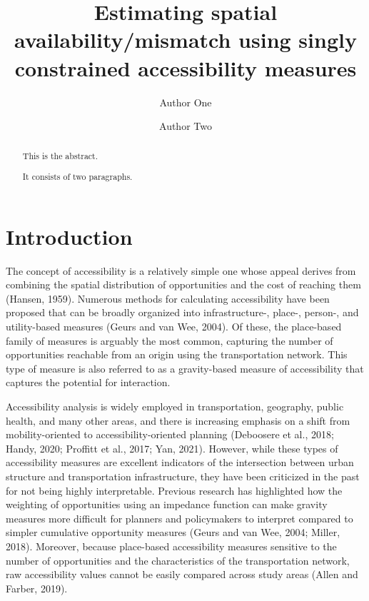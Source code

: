 \documentclass[]{elsarticle} %
\begin{document}
\begin{frontmatter}

  \title{Estimating spatial availability/mismatch using singly
constrained accessibility measures}
    \author[Some School]{Author One}
    \author[Some School]{Author Two}
      \address[Some School]{Address}
  
  \begin{abstract}
  This is the abstract.

  It consists of two paragraphs.
  \end{abstract}
  
 \end{frontmatter}

\newpage

\hypertarget{introduction}{%
\section{Introduction}\label{introduction}}

The concept of accessibility is a relatively simple one whose appeal
derives from combining the spatial distribution of opportunities and the
cost of reaching them (Hansen, 1959). Numerous methods for calculating
accessibility have been proposed that can be broadly organized into
infrastructure-, place-, person-, and utility-based measures (Geurs and
van Wee, 2004). Of these, the place-based family of measures is arguably
the most common, capturing the number of opportunities reachable from an
origin using the transportation network. This type of measure is also
referred to as a gravity-based measure of accessibility that captures
the potential for interaction.

Accessibility analysis is widely employed in transportation, geography,
public health, and many other areas, and there is increasing emphasis on
a shift from mobility-oriented to accessibility-oriented planning
(Deboosere et al., 2018; Handy, 2020; Proffitt et al., 2017; Yan, 2021).
However, while these types of accessibility measures are excellent
indicators of the intersection between urban structure and
transportation infrastructure, they have been criticized in the past for
not being highly interpretable. Previous research has highlighted how
the weighting of opportunities using an impedance function can make
gravity measures more difficult for planners and policymakers to
interpret compared to simpler cumulative opportunity measures (Geurs and
van Wee, 2004; Miller, 2018). Moreover, because place-based
accessibility measures sensitive to the number of opportunities and the
characteristics of the transportation network, raw accessibility values
cannot be easily compared across study areas (Allen and Farber, 2019).
\end{document}

